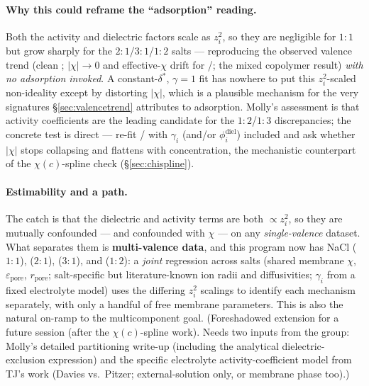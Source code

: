 \documentclass[11pt]{article}
\newcommand{\note}[1]{{\color{blue}\textsf{(#1)}}}
\newcommand{\dstar}{\delta^{*}}
\begin{document}
\paragraph{Why this could reframe the ``adsorption'' reading.} Both the activity
and dielectric factors scale as $z_i^2$, so they are negligible for $1{:}1$
 but grow sharply for the $2{:}1$/$3{:}1$/$1{:}2$ salts --- reproducing
the observed valence trend (clean ; $|\chi|\to0$ and effective-$\chi$
drift for /; the mixed copolymer  result) \emph{with
no adsorption invoked}. A constant-$\dstar$, $\gamma=1$ fit has nowhere to put this
$z_i^2$-scaled non-ideality except by distorting $|\chi|$, which is a plausible
mechanism for the very signatures \S\ref{sec:valencetrend} attributes to
adsorption. Molly's assessment is that activity coefficients are the leading
candidate for the $1{:}2$/$1{:}3$ discrepancies; the concrete test is direct ---
re-fit / with $\gamma_i$ (and/or $\phi_i^{\text{diel}}$)
included and ask whether $|\chi|$ stops collapsing and flattens with
concentration, the mechanistic counterpart of the $\chi(c)$-spline check
(\S\ref{sec:chispline}).

\paragraph{Estimability and a path.} The catch is that the dielectric and activity
terms are both $\propto z_i^2$, so they are mutually confounded --- and confounded
with $\chi$ --- on any \emph{single-valence} dataset. What separates them is
\textbf{multi-valence data}, and this program now has NaCl ($1{:}1$), 
($2{:}1$),  ($3{:}1$), and  ($1{:}2$): a \emph{joint}
regression across salts (shared membrane $\chi$, $\varepsilon_{\text{pore}}$,
$r_{\text{pore}}$; salt-specific but literature-known ion radii and diffusivities;
$\gamma_i$ from a fixed electrolyte model) uses the differing $z_i^2$ scalings to
identify each mechanism separately, with only a handful of free membrane
parameters. This is also the natural on-ramp to the multicomponent goal.
\note{Foreshadowed extension for a future session (after the $\chi(c)$-spline
work). Needs two inputs from the group: Molly's detailed partitioning write-up
(including the analytical dielectric-exclusion expression) and the specific
electrolyte activity-coefficient model from TJ's work (Davies vs.\ Pitzer;
external-solution only, or membrane phase too).}

\end{document}
